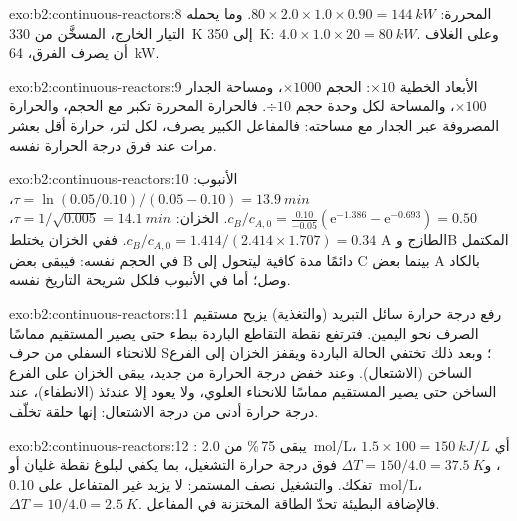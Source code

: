 \begin{solution}{exo:b2:continuous-reactors:8}
المحررة: $80 \times 2.0 \times 1.0 \times 0.90 = \qty{144}{kW}$. وما يحمله
التيار الخارج، المسخَّن من \qty{330}{K} إلى \qty{350}{K}: $4.0 \times 1.0 \times 20 =
\qty{80}{kW}$. وعلى الغلاف أن يصرف الفرق، \qty{64}{kW}.
\end{solution}

\begin{solution}{exo:b2:continuous-reactors:9}
الأبعاد الخطية $\times 10$: الحجم $\times 1000$، ومساحة الجدار $\times 100$، والمساحة
لكل وحدة حجم $\div 10$. فالحرارة المحررة تكبر مع الحجم، والحرارة
المصروفة عبر الجدار مع مساحته: فالمفاعل الكبير يصرف، لكل لتر،
حرارة أقل بعشر مرات عند فرق درجة الحرارة نفسه.
\end{solution}

\begin{solution}{exo:b2:continuous-reactors:10}
الأنبوب: $\tau = \ln(0.05/0.10)/(0.05 - 0.10) = \qty{13.9}{min}$، $c_B/c_{A,0} =
\frac{0.10}{-0.05}(\mathrm e^{-1.386} - \mathrm e^{-0.693}) = 0.50$. الخزان: $\tau =
1/\sqrt{0.005} = \qty{14.1}{min}$، $c_B/c_{A,0} = 1.414/(2.414 \times 1.707) =
0.34$. ففي الخزان يختلط A الطازج وB المكتمل في الحجم نفسه: فيبقى بعض
B دائمًا مدة كافية ليتحول إلى C بينما بعض A بالكاد
وصل؛ أما في الأنبوب فلكل شريحة التاريخ نفسه.
\end{solution}

\begin{solution}{exo:b2:continuous-reactors:11}
رفع درجة حرارة سائل التبريد (والتغذية) يزيح مستقيم الصرف نحو
اليمين. فترتفع نقطة التقاطع الباردة ببطء حتى يصير المستقيم مماسًا
للانحناء السفلي من حرف S؛ وبعد ذلك تختفي الحالة الباردة ويقفز الخزان
إلى الفرع الساخن (الاشتعال). وعند خفض درجة الحرارة من جديد، يبقى الخزان
على الفرع الساخن حتى يصير المستقيم مماسًا للانحناء العلوي، ولا يعود
إلا عندئذ (الانطفاء)، عند درجة حرارة أدنى من درجة الاشتعال: إنها
حلقة تخلّف.
\end{solution}

\begin{solution}{exo:b2:continuous-reactors:12}
: يبقى 75\,\% من \qty{2.0}{mol/L}، أي $1.5 \times 100 = \qty{150}{kJ/L}$،
و$\Delta T = 150/4.0 = \qty{37.5}{K}$ فوق درجة حرارة التشغيل، بما يكفي
لبلوغ نقطة غليان أو تفكك. والتشغيل نصف المستمر: لا يزيد غير المتفاعل
على \qty{0.10}{mol/L}، $\Delta T = 10/4.0 = \qty{2.5}{K}$. فالإضافة البطيئة
تحدّ الطاقة المختزنة في المفاعل.
\end{solution}

